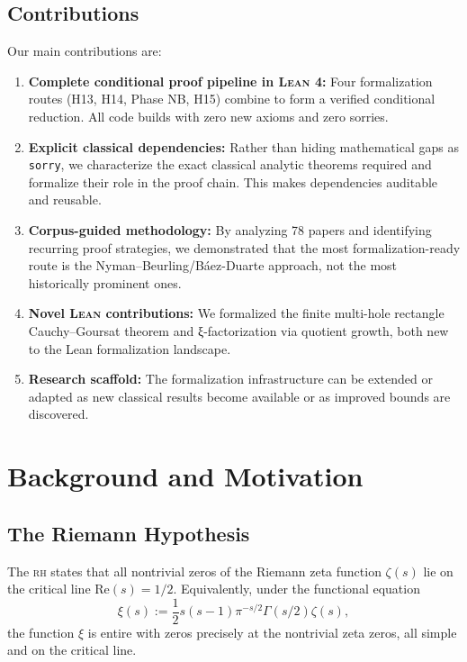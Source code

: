 \documentclass[11pt,a4paper]{article}
\newcommand{\RH}{\textsc{rh}\xspace}
\newcommand{\Lean}{\textsc{Lean}\xspace}
\newcommand{\CodeName}[1]{\texttt{#1}}
\begin{document}
\subsection{Contributions}

Our main contributions are:

\begin{enumerate}
  \item \textbf{Complete conditional proof pipeline in \Lean 4:} Four formalization routes (H13, H14, Phase NB, H15) combine to form a verified conditional reduction. All code builds with zero new axioms and zero sorries.

  \item \textbf{Explicit classical dependencies:} Rather than hiding mathematical gaps as \CodeName{sorry}, we characterize the exact classical analytic theorems required and formalize their role in the proof chain. This makes dependencies auditable and reusable.

  \item \textbf{Corpus-guided methodology:} By analyzing 78 papers and identifying recurring proof strategies, we demonstrated that the most formalization-ready route is the Nyman--Beurling/Báez-Duarte approach, not the most historically prominent ones.

  \item \textbf{Novel \Lean contributions:} We formalized the finite multi-hole rectangle Cauchy--Goursat theorem and ξ-factorization via quotient growth, both new to the Lean formalization landscape.

  \item \textbf{Research scaffold:} The formalization infrastructure can be extended or adapted as new classical results become available or as improved bounds are discovered.
\end{enumerate}

\section{Background and Motivation}
\label{sec:background}

\subsection{The Riemann Hypothesis}

The \RH states that all nontrivial zeros of the Riemann zeta function $\zeta(s)$ lie on the critical line $\text{Re}(s) = 1/2$. Equivalently, under the functional equation
\[
  \xi(s) := \frac{1}{2}s(s-1)\pi^{-s/2}\Gamma(s/2)\zeta(s),
\]
the function $\xi$ is entire with zeros precisely at the nontrivial zeta zeros, all simple and on the critical line.
\end{document}
